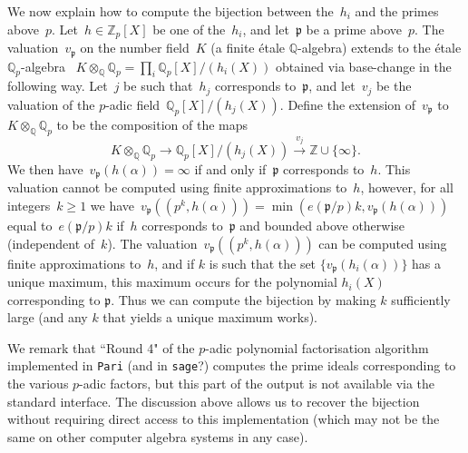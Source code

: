 \documentclass{article}
\def\Z{{\mathbb Z}}
\def\Q{{\mathbb Q}}
\def\p{{\mathfrak p}}
\begin{document}
We now explain how to compute the bijection between the~$h_i$ and the primes
above~$p$. Let~$h\in\Z_p[X]$ be one of the~$h_i$, and let~$\p$ be a prime
above~$p$. The valuation~$v_{\p}$ on the number field~$K$ (a finite \'etale $\Q$-algebra) extends to the \'etale $\Q_p$-algebra ~$K\otimes_{\Q}\Q_p = \prod_i
\Q_p[X]/(h_i(X))$ obtained via base-change in the following way.
Let~$j$ be such that~$h_{j}$ corresponds
to~$\p$, and let~$v_j$ be the valuation of the $p$-adic field~$\Q_p[X]/(h_j(X))$.
Define the extension of~$v_\p$ to $K\otimes_\Q\Q_p$ to be the composition of the maps
\[
  K\otimes_{\Q}\Q_p \longrightarrow \Q_p[X]/(h_j(X)) \stackrel{v_j}{\longrightarrow} \Z\cup\{\infty\}.
\]
We then have~$v_{\p}(h(\alpha)) = \infty$ if and only
if~$\p$ corresponds to~$h$.
This valuation cannot be computed using finite
approximations to~$h$, however, for all integers~$k\ge 1$ we have~$v_\p((p^k,h(\alpha)))
= \min(e(\p/p)k, v_\p(h(\alpha)))$ equal to~$e(\p/p)k$
if~$h$ corresponds to~$\p$ and bounded above otherwise (independent of~$k$). The
valuation~$v_\p((p^k,h(\alpha)))$ can be computed using finite approximations
to~$h$, and if $k$ is such that the set $\{v_\p(h_i(\alpha))\}$ has a unique maximum, this maximum occurs for the polynomial $h_i(X)$ corresponding to $\p$.
Thus we can compute the bijection by making $k$ sufficiently large (and any $k$ that yields a unique maximum works).

We remark that ``Round 4" of the $p$-adic polynomial factorisation algorithm
implemented in \texttt{Pari} (and in \texttt{sage}?) \cite{Roblot}
computes the prime ideals corresponding to the various $p$-adic factors, but
this part of the output is not available via the standard interface.
The discussion above allows us to recover the bijection without requiring direct access to this implementation (which may not be the same on other computer algebra systems in any case).
\end{document}
